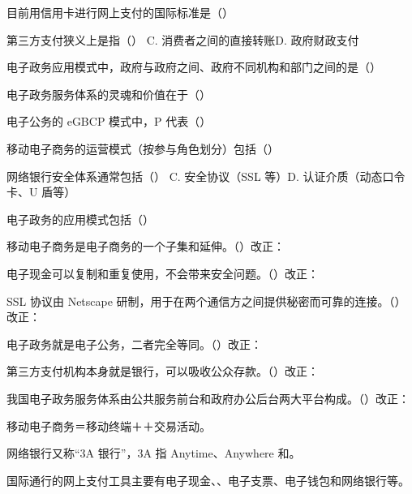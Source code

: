 \documentclass[a4paper,11pt]{article}
\begin{document}
\q 目前用信用卡进行网上支付的国际标准是（\quad）

\q 第三方支付狭义上是指（\quad）
{C. 消费者之间的直接转账}{D. 政府财政支付}

\q 电子政务应用模式中，政府与政府之间、政府不同机构和部门之间的是（\quad）

\q 电子政务服务体系的灵魂和价值在于（\quad）

\q 电子公务的 eGBCP 模式中，P 代表（\quad）

\q 移动电子商务的运营模式（按参与角色划分）包括（\quad）

\q 网络银行安全体系通常包括（\quad）
{C. 安全协议（SSL 等）}{D. 认证介质（动态口令卡、U 盾等）}

\q 电子政务的应用模式包括（\quad）

\q 移动电子商务是电子商务的一个子集和延伸。\quad（\quad）\quad 改正：\fixblank

\q 电子现金可以复制和重复使用，不会带来安全问题。\quad（\quad）\quad 改正：\fixblank

\q SSL 协议由 Netscape 研制，用于在两个通信方之间提供秘密而可靠的连接。\quad（\quad）\quad 改正：\fixblank

\q 电子政务就是电子公务，二者完全等同。\quad（\quad）\quad 改正：\fixblank

\q 第三方支付机构本身就是银行，可以吸收公众存款。\quad（\quad）\quad 改正：\fixblank

\q 我国电子政务服务体系由公共服务前台和政府办公后台两大平台构成。\quad（\quad）\quad 改正：\fixblank

\q 移动电子商务＝移动终端＋\fillblanks[1.6cm]＋交易活动。

\q 网络银行又称“3A 银行”，3A 指 Anytime、Anywhere 和\fillblanks[2.0cm]。

\q 国际通行的网上支付工具主要有电子现金、\fillblanks[2.4cm]、电子支票、电子钱包和网络银行等。
\end{document}
